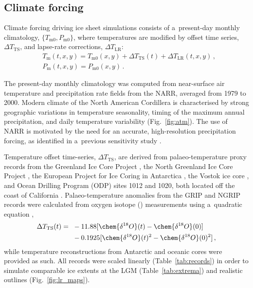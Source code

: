\documentclass[tc, manuscript]{copernicus}
\begin{document}
\subsection{Climate forcing}
\label{sec:atm}

      Climate forcing driving ice sheet simulations consists of
      a~present-day monthly climatology,
$\{T_{\mathrm{m}0}, P_{\mathrm{m}0}\}$, where temperatures are modified by offset time series,
${\Delta}T_{\text{TS}}$, and lapse-rate corrections, ${\Delta}T_{\text{LR}}$:
\begin{align}
&T_{\mathrm{m}}(t, x, y) = T_{\mathrm{m}0}(x, y) + {\Delta}T_{\text{TS}}(t)
                    + {\Delta}T_{\text{LR}}(t, x, y) \,, \\
&    P_{\mathrm{m}}(t, x, y) = P_{\mathrm{m}0}(x, y) \,.
\end{align}

      The present-day monthly climatology was computed from near-surface air
      temperature and precipitation rate fields from the NARR, averaged from
      1979 to 2000. Modern climate of the North American Cordillera is
      characterised by strong geographic variations in temperature
      seasonality, timing of the maximum annual precipitation, and daily
      temperature variability (Fig.~\ref{fig:atm}). The use of NARR is
      motivated by the need for an accurate, high-resolution precipitation
      forcing, as identified in a~previous sensitivity study
      \citep{Seguinot.etal.2014}.

      Temperature offset time-series, ${\Delta}T_{\text{TS}}$, are derived from
      palaeo-temperature proxy records from the Greenland Ice Core Project
      \citep[GRIP,][]{Dansgaard.etal.1993}, the North Greenland Ice Core
      Project \citep[NGRIP,][]{Andersen.etal.2004}, the European Project for
      Ice Coring in Antarctica \citep[EPICA,][] {Jouzel.etal.2007}, the
      Vostok ice core \citep{Petit.etal.1999}, and Ocean Drilling Program
      (ODP) sites 1012 and 1020, both located off the coast of California
      \citep{Herbert.etal.2001}. Palaeo-temperature anomalies from the GRIP
      and NGRIP records were calculated from oxygen isotope
      () measurements using a~quadratic equation
      \citep{Johnsen.etal.1995},
\begin{align}
{\Delta}T_{\text{TS}}(t) ={~}&-11.88 [\chem{\delta^{18}O}(t)
                                -\chem{\delta^{18}O}(0)] \nonumber \\
                        &-0.1925[\chem{\delta^{18}O}(t)^2
                                 -\chem{\delta^{18}O}(0)^2] \,,
\end{align}
      while temperature reconstructions from Antarctic and oceanic cores
      were provided as such. All records were scaled linearly
      (Table~\ref{tab:records}) in order to simulate comparable ice extents
      at the LGM (Table~\ref{tab:extrema}) and realistic outlines
      (Fig.~\ref{fig:lr_maps}).
\end{document}
